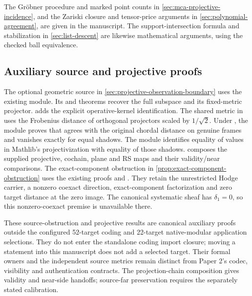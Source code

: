 The Gr\"obner procedure and marked point counts in
\cref{sec:mca-projective-incidence}, and the Zariski closure and tensor-price
arguments in \cref{sec:polynomial-agreement}, are given in the manuscript.
The support-intersection formula and stabilization in \cref{sec:list-descent}
are likewise mathematical arguments, using the checked ball equivalence.

\subsection{Auxiliary source and projective proofs}

The optional geometric source in
\cref{sec:projective-observation-boundary} uses the existing
 module.
Its  and 
theorems recover the full subspace and its fixed-metric projector.
adds the explicit operative-kernel identification.
The shared metric in  uses the Frobenius
distance of orthogonal projectors scaled by \(1/\sqrt{2}\).
Under , the
 module proves that 
agrees with the original chordal distance on genuine frames and vanishes
exactly for equal shadows. The  module identifies
equality of  values in Mathlib's projectivization
with equality of those shadows.
 composes the supplied
projective, cochain, plane and RS maps and their validity/near comparisons.
The exact-component obstruction in
\cref{prop:exact-component-obstruction} uses the existing
 proofs
 and
.
They retain the unrestricted Hodge carrier, a nonzero coexact direction,
exact-component factorization and zero target distance at the zero image.
The canonical systematic sheaf has \(\delta_1=0\), so this nonzero-coexact
premise is unavailable there.

These source-obstruction and projective results are canonical auxiliary proofs
outside the configured 52-target coding and 22-target native-modular
application selections. They do not enter the standalone coding import
closure; moving a statement into this manuscript does not add a selected
target. Their formal owners and the independent source metrics remain
distinct from Paper 2's codec, visibility and authentication contracts.
The projection-chain composition gives validity and near-side handoffs;
source-far preservation requires the separately stated calibration.

